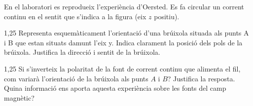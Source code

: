 En el laboratori es reprodueix l'experiència d'Oersted. Es fa circular un corrent continu en el sentit que s'indica a la figura (eix $z$ positiu).


\begin{apartat}{1,25}
Representa esquemàticament l'orientació d'una brúixola situada als punts A i B que estan situats damunt l'eix y. Indica clarament la posició dels pols de la brúixola. Justifica la direcció i sentit de la brúixola.
\end{apartat}

\begin{apartat}{1,25}
Si s'inverteix la polaritat de la font de corrent continu que alimenta el fil, com variarà l'orientació de la brúixola als punts $A$ i $B$? Justifica la resposta. Quina informació ens aporta aquesta experiència sobre les fonts del camp magnètic?
\end{apartat}

